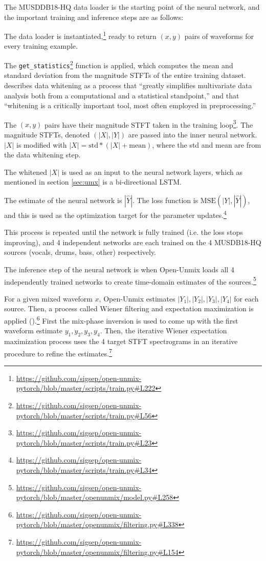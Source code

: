 \documentclass[report.tex]{subfiles}
\begin{document}
The MUSDDB18-HQ data loader is the starting point of the neural network, and the important training and inference steps are as follows:

\begin{tight_enumerate}
	\item
		The data loader is instantiated,\footnote{\url{https://github.com/sigsep/open-unmix-pytorch/blob/master/scripts/train.py\#L222}} ready to return $(x, y)$ pairs of waveforms for every training example.
	\item
		The \Verb#get_statistics#\footnote{\url{https://github.com/sigsep/open-unmix-pytorch/blob/master/scripts/train.py\#L56}} function is applied, which computes the mean and standard deviation from the magnitude STFTs of the entire training dataset. \textcite{Kessy_2018} describes data whitening as a process that ``greatly simplifies multivariate data analysis both from a computational and a statistical standpoint,'' and that ``whitening is a critically important tool, most often employed in preprocessing.''
	\item
		The $(x, y)$ pairs have their magnitude STFT taken in the training loop\footnote{\url{https://github.com/sigsep/open-unmix-pytorch/blob/master/scripts/train.py\#L23}}. The magnitude STFTs, denoted $(|X|, |Y|)$ are passed into the inner neural network. $|X|$ is modified with $|X| = \text{std}*(|X|+\text{mean})$, where the std and mean are from the data whitening step.
	\item
		The whitened $|X|$ is used as an input to the neural network layers, which as mentioned in section \ref{sec:umx} is a bi-directional LSTM.
	\item
		The estimate of the neural network is $|\hat{Y}|$. The loss function is $\text{MSE}(|Y|, |\hat{Y}|)$, and this is used as the optimization target for the parameter updates.\footnote{\url{https://github.com/sigsep/open-unmix-pytorch/blob/master/scripts/train.py\#L34}}
	\item
		This process is repeated until the network is fully trained (i.e. the loss stops improving), and 4 independent networks are each trained on the 4 MUSDB18-HQ sources (vocals, drums, bass, other) respectively.
	\item
		The inference step of the neural network is when Open-Unmix loads all 4 independently trained networks to create time-domain estimates of the sources.\footnote{\url{https://github.com/sigsep/open-unmix-pytorch/blob/master/openunmix/model.py\#L258}}
	\item
		For a given mixed waveform $x$, Open-Unmix estimates $|Y_{1}|, |Y_{2}|, |Y_{3}|, |Y_{4}|$ for each source. Then, a process called Wiener filtering and expectation maximization is applied (\cite{umxorig1, wiener2, wiener3, wiener4}).\footnote{\url{https://github.com/sigsep/open-unmix-pytorch/blob/master/openunmix/filtering.py\#L338}} First the mix-phase inversion is used to come up with the first waveform estimate $y_{1}, y_{2}, y_{3}, y_{4}$. Then, the iterative Wiener expectation maximization process uses the 4 target STFT spectrograms in an iterative procedure to refine the estimates.\footnote{\url{https://github.com/sigsep/open-unmix-pytorch/blob/master/openunmix/filtering.py\#L154}}
\end{tight_enumerate}
\end{document}

